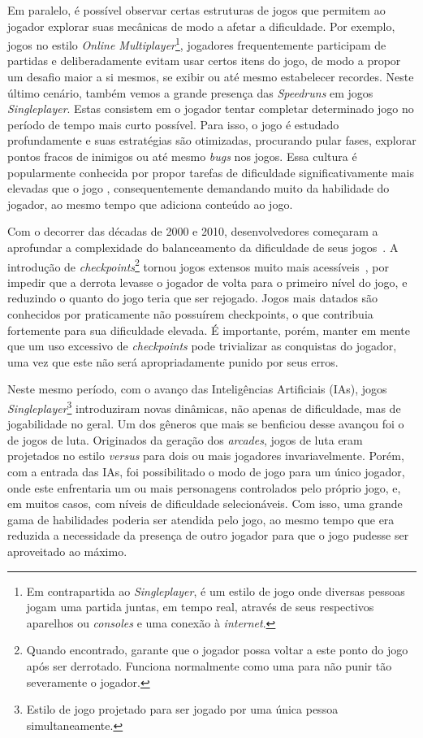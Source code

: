 Em paralelo, é possível observar certas estruturas de jogos que permitem ao jogador explorar suas mecânicas de modo a afetar a dificuldade. Por exemplo, jogos no estilo \textit{Online Multiplayer}\footnote{
    Em contrapartida ao \textit{Singleplayer}, é um estilo de jogo onde diversas pessoas jogam uma partida juntas, em tempo real, através de seus respectivos aparelhos ou \textit{consoles} e uma conexão à \textit{internet}.
}, jogadores frequentemente participam de partidas e deliberadamente evitam usar certos itens do jogo, de modo a propor um desafio maior a si mesmos, se exibir ou até mesmo estabelecer recordes. Neste último cenário, também vemos a grande presença das \textit{Speedruns} em jogos \textit{Singleplayer}. Estas consistem em o jogador tentar completar determinado jogo no período de tempo mais curto possível. Para isso, o jogo é estudado profundamente e suas estratégias são otimizadas, procurando pular fases, explorar pontos fracos de inimigos ou até mesmo \textit{bugs} nos jogos. Essa cultura é popularmente conhecida por propor tarefas de dificuldade significativamente mais elevadas que o jogo \textquotedbl{}, consequentemente demandando muito da habilidade do jogador, ao mesmo tempo que adiciona conteúdo ao jogo.

Com o decorrer das décadas de 2000 e 2010, desenvolvedores começaram a aprofundar a complexidade do balanceamento da dificuldade de seus jogos~\citep{Zork:81}. A introdução de \textit{checkpoints}\footnote{
    Quando encontrado, garante que o jogador possa voltar a este ponto do jogo após ser derrotado. Funciona normalmente como uma \textquotedbl{} para não punir tão severamente o jogador.
} tornou jogos extensos muito mais acessíveis~\citep{GameTime}, por impedir que a derrota levasse o jogador de volta para o primeiro nível do jogo, e reduzindo o quanto do jogo teria que ser rejogado. Jogos mais datados são conhecidos por praticamente não possuírem checkpoints, o que contribuia fortemente para sua dificuldade elevada. É importante, porém, manter em mente que um uso excessivo de \textit{checkpoints} pode trivializar as conquistas do jogador, uma vez que este não será apropriadamente punido por seus erros.

Neste mesmo período, com o avanço das Inteligências Artificiais (IAs), jogos \textit{Singleplayer}\footnote{
    Estilo de jogo projetado para ser jogado por uma única pessoa simultaneamente.
} introduziram novas dinâmicas, não apenas de dificuldade, mas de jogabilidade no geral. Um dos gêneros que mais se benficiou desse avançou foi o de jogos de luta. Originados da geração dos \textit{arcades}, jogos de luta eram projetados no estilo \textit{versus} para dois ou mais jogadores invariavelmente. Porém, com a entrada das IAs, foi possibilitado o modo de jogo para um único jogador, onde este enfrentaria um ou mais personagens controlados pelo próprio jogo, e, em muitos casos, com níveis de dificuldade selecionáveis. Com isso, uma grande gama de habilidades poderia ser atendida pelo jogo, ao mesmo tempo que era reduzida a necessidade da presença de outro jogador para que o jogo pudesse ser aproveitado ao máximo.

